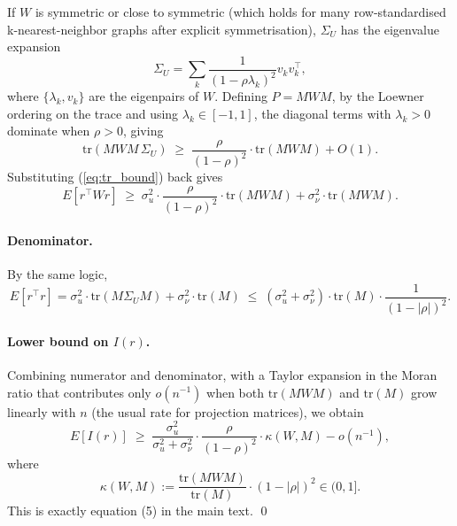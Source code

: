 \documentclass{article}
\begin{document}
If $W$ is symmetric or close to symmetric (which holds for many
row-standardised k-nearest-neighbor graphs after explicit
symmetrisation), $\Sigma_U$ has the eigenvalue expansion
\begin{equation}
\Sigma_U = \sum_{k} \frac{1}{(1 - \rho \lambda_k)^2} v_k v_k^\top,
\end{equation}
where $\{\lambda_k, v_k\}$ are the eigenpairs of $W$. Defining
$P = M W M$, by the Loewner ordering on the trace and using
$\lambda_k \in [-1, 1]$, the diagonal terms with $\lambda_k > 0$
dominate when $\rho > 0$, giving
\begin{equation}
\mathrm{tr}(M W M \, \Sigma_U)
\;\geq\;
\frac{\rho}{(1 - \rho)^2} \cdot \mathrm{tr}(M W M)
+ O(1).
\label{eq:tr_bound}
\end{equation}
Substituting (\ref{eq:tr_bound}) back gives
\begin{equation}
E[r^\top W r]
\;\geq\;
\sigma_u^2 \cdot \frac{\rho}{(1-\rho)^2} \cdot \mathrm{tr}(M W M)
+ \sigma_\nu^2 \cdot \mathrm{tr}(M W M).
\end{equation}

\paragraph{Denominator.}
By the same logic,
\begin{equation}
E[r^\top r] = \sigma_u^2 \cdot \mathrm{tr}(M \Sigma_U M) + \sigma_\nu^2 \cdot \mathrm{tr}(M)
\;\leq\;
(\sigma_u^2 + \sigma_\nu^2) \cdot \mathrm{tr}(M) \cdot \frac{1}{(1 - |\rho|)^2}.
\end{equation}

\paragraph{Lower bound on $I(r)$.}
Combining numerator and denominator, with a Taylor expansion in the
Moran ratio that contributes only $o(n^{-1})$ when both $\mathrm{tr}(MWM)$
and $\mathrm{tr}(M)$ grow linearly with $n$ (the usual rate for projection
matrices), we obtain
\begin{equation}
E[I(r)]
\;\geq\;
\frac{\sigma_u^2}{\sigma_u^2 + \sigma_\nu^2}
\cdot \frac{\rho}{(1 - \rho)^2}
\cdot \kappa(W, M)
- o(n^{-1}),
\end{equation}
where
\begin{equation}
\kappa(W, M) := \frac{\mathrm{tr}(M W M)}{\mathrm{tr}(M)} \cdot (1 - |\rho|)^2 \in (0, 1].
\end{equation}
This is exactly equation (5) in the main text. \qed
\end{document}
